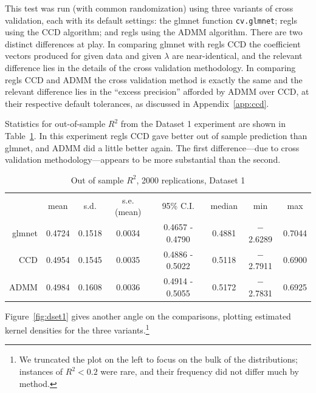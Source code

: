 \documentclass{article}
\begin{document}
This test was run (with common randomization) using three variants of
cross validation, each with its default settings: the \textsf{glmnet}
function \texttt{cv.glmnet}; \textrm{regls} using the CCD algorithm;
and \textsf{regls} using the ADMM algorithm. There are two distinct
differences at play. In comparing \textsf{glmnet} with \textsf{regls}
CCD the coefficient vectors produced for given data and given
$\lambda$ are near-identical, and the relevant difference lies in the
details of the cross validation methodology. In comparing
\textsf{regls} CCD and ADMM the cross validation method is exactly the
same and the relevant difference lies in the ``excess precision''
afforded by ADMM over CCD, at their respective default tolerances, as
discussed in Appendix~\ref{app:ccd}.


Statistics for out-of-sample $R^2$ from the Dataset 1 experiment are
shown in Table~\ref{tab:dset1}. In this experiment \textsf{regls} CCD
gave better out of sample prediction than \textsf{glmnet}, and ADMM
did a little better again. The first difference---due to cross
validation methodology---appears to be more substantial than the
second.

\begin{table}[htbp]
  \centering
  \begin{tabular}{rccccccc}
 & mean & s.d. & s.e.(mean) & 95\% C.I. & median & min & max \\
      glmnet & 0.4724 & 0.1518 & 0.0034 & 0.4657 - 0.4790 & 0.4881 & $-$2.6289 & 0.7044 \\
        CCD & 0.4954 & 0.1545 & 0.0035 & 0.4886 - 0.5022 & 0.5118 & $-$2.7911 & 0.6900 \\
       ADMM & 0.4984 & 0.1608 & 0.0036 & 0.4914 - 0.5055 & 0.5172 & $-$2.7831 & 0.6925 \\
  \end{tabular}
  \caption{Out of sample $R^2$, 2000 replications, Dataset 1}
  \label{tab:dset1}
\end{table}

Figure~\ref{fig:dset1} gives another angle on the comparisons,
plotting estimated kernel densities for the three
variants.\footnote{We truncated the plot on the left to focus on the
  bulk of the distributions; instances of $R^2 < 0.2$ were rare, and
  their frequency did not differ much by method.}
\end{document}
